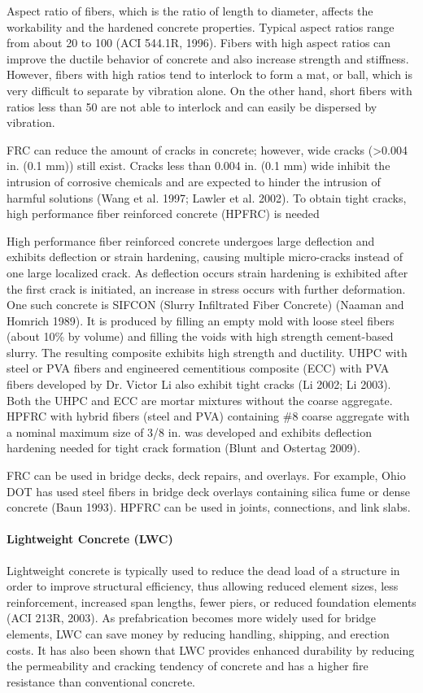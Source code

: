 Aspect ratio of fibers, which is the ratio of length to diameter, affects the workability and the hardened concrete
properties. Typical aspect ratios range from about 20 to 100 (ACI 544.1R, 1996). Fibers with high aspect ratios can
improve the ductile behavior of concrete and also increase strength and stiffness. However, fibers with high ratios
tend to interlock to form a mat, or ball, which is very difficult to separate by vibration alone. On the other hand, short
fibers with ratios less than 50 are not able to interlock and can easily be dispersed by vibration.

FRC can reduce the amount of cracks in concrete; however, wide cracks (>0.004 in. (0.1 mm)) still exist. Cracks
less than 0.004 in. (0.1 mm) wide inhibit the intrusion of corrosive chemicals and are expected to hinder the intrusion
of harmful solutions (Wang et al. 1997; Lawler et al. 2002). To obtain tight cracks, high performance fiber
reinforced concrete (HPFRC) is needed

High performance fiber reinforced concrete undergoes large deflection and exhibits deflection or strain
hardening, causing multiple micro-cracks instead of one large localized crack. As deflection occurs strain hardening
is exhibited after the first crack is initiated, an increase in stress occurs with further deformation. One such concrete
is SIFCON (Slurry Infiltrated Fiber Concrete) (Naaman and Homrich 1989). It is produced by filling an empty mold
with loose steel fibers (about 10\% by volume) and filling the voids with high strength cement-based slurry. The
resulting composite exhibits high strength and ductility. UHPC with steel or PVA fibers and engineered cementitious composite (ECC) with PVA fibers developed by Dr. Victor Li also exhibit tight cracks (Li 2002; Li
2003). Both the UHPC and ECC are mortar mixtures without the coarse aggregate. HPFRC with hybrid fibers (steel
and PVA) containing \#8 coarse aggregate with a nominal maximum size of 3/8 in. was developed and exhibits
deflection hardening needed for tight crack formation (Blunt and Ostertag 2009).

FRC can be used in bridge decks, deck repairs, and overlays. For example, Ohio DOT has used steel fibers in
bridge deck overlays containing silica fume or dense concrete (Baun 1993). HPFRC can be used in joints,
connections, and link slabs.

\paragraph{Lightweight Concrete (LWC)}
Lightweight concrete is typically used to reduce the dead load of a structure in order to improve structural
efficiency, thus allowing reduced element sizes, less reinforcement, increased span lengths, fewer piers, or reduced
foundation elements (ACI 213R, 2003). As prefabrication becomes more widely used for bridge elements, LWC can
save money by reducing handling, shipping, and erection costs. It has also been shown that LWC provides enhanced
durability by reducing the permeability and cracking tendency of concrete and has a higher fire resistance than
conventional concrete.

